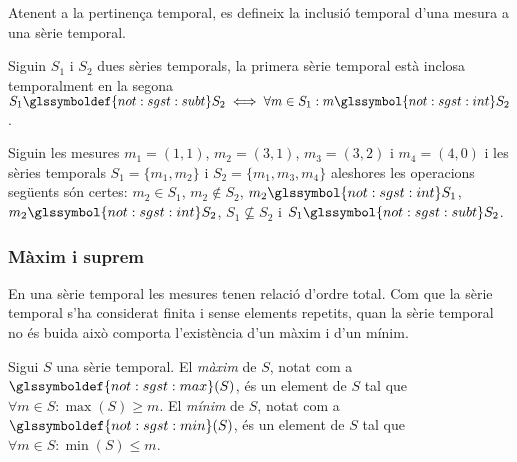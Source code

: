 Atenent a la pertinença temporal, es defineix la inclusió temporal
d'una mesura a una sèrie temporal.
\begin{definition}
  Siguin $S_1$ i $S_2$
  dues sèries temporals, la primera sèrie temporal està inclosa
  temporalment en la segona $S_1 \glssymboldef{not:sgst:subt} S_2 \iff \forall m \in S_1: m \glssymbol{not:sgst:int} S_2$.
\end{definition}




\begin{example}
  Siguin les mesures $m_1=(1,1)$, $m_2=(3,1)$, $m_3=(3,2)$ i
  $m_4=(4,0)$ i les sèries temporals $S_1=\{m_1,m_2\}$ i
  $S_2=\{m_1,m_3,m_4\}$ aleshores les operacions següents són certes:
  $m_2 \in S_1$, $m_2 \notin S_2$, $m_2 \glssymbol{not:sgst:int} S_1$,
  $m_2 \glssymbol{not:sgst:int} S_2$, $S_1\not\subseteq S_2$ i
  $S_1\glssymbol{not:sgst:subt} S_2$.
\end{example}

\subsubsection{Màxim i suprem}


En una sèrie temporal les mesures tenen relació d'ordre total. Com que
la sèrie temporal s'ha considerat finita i sense elements repetits,
quan la sèrie temporal no és buida això comporta l'existència d'un
màxim i d'un mínim. 

\begin{definition}
  Sigui $S$ una sèrie temporal. El \emph{màxim} de $S$, notat com a
  $\glssymboldef{not:sgst:max}(S)$, és un element de $S$ tal que
  $\forall m \in S: \max(S) \geq m$.  El \emph{mínim} de $S$, notat com a
  $\glssymboldef{not:sgst:min}(S)$, és un element de $S$ tal que
  $\forall m \in S: \min(S) \leq m$.
\end{definition}

